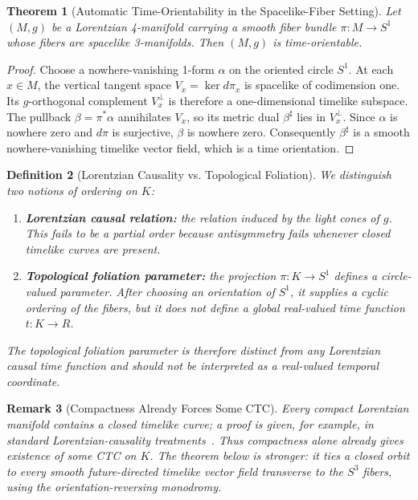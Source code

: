 \documentclass[11pt]{article}
\theoremstyle{canonmath}
\newtheorem{theorem}{Theorem}[section]
\newtheorem{definition}[theorem]{Definition}
\newtheorem{remark}[theorem]{Remark}
\theoremstyle{canonpostulate}
\theoremstyle{canonproposition}
\providecommand{\Klein}{\mathcal{K}}
\providecommand{\R}{\mathbb{R}}
\providecommand{\Sone}{S^1}
\providecommand{\Sthree}{S^3}
\def\mathbb#1{#1}%
\def\mathcal#1{#1}%
\begin{document}
\begin{theorem}[Automatic Time-Orientability in the Spacelike-Fiber Setting] \label{thm:automatic_timeorientation}
Let $(M,g)$ be a Lorentzian 4-manifold carrying a smooth fiber bundle $\pi:M\to\Sone$ whose fibers are spacelike 3-manifolds. Then $(M,g)$ is time-orientable.
\end{theorem}
\begin{proof}
Choose a nowhere-vanishing 1-form $\alpha$ on the oriented circle $\Sone$. At each $x\in M$, the vertical tangent space $V_x=\ker d\pi_x$ is spacelike of codimension one. Its $g$-orthogonal complement $V_x^{\perp}$ is therefore a one-dimensional timelike subspace. The pullback $\beta=\pi^*\alpha$ annihilates $V_x$, so its metric dual $\beta^\sharp$ lies in $V_x^{\perp}$. Since $\alpha$ is nowhere zero and $d\pi$ is surjective, $\beta$ is nowhere zero. Consequently $\beta^\sharp$ is a smooth nowhere-vanishing timelike vector field, which is a time orientation.
\end{proof}

\begin{definition}[Lorentzian Causality vs. Topological Foliation] \label{def:causality}
We distinguish two notions of ordering on $\Klein$:
\begin{enumerate}
    \item \textbf{Lorentzian causal relation:} the relation induced by the light cones of $g$. This fails to be a partial order because antisymmetry fails whenever closed timelike curves are present.
    \item \textbf{Topological foliation parameter:} the projection $\pi:\Klein\to\Sone$ defines a circle-valued parameter. After choosing an orientation of $\Sone$, it supplies a cyclic ordering of the fibers, but it does not define a global real-valued time function $t:\Klein\to\R$.
\end{enumerate}
The topological foliation parameter is therefore distinct from any Lorentzian causal time function and should not be interpreted as a real-valued temporal coordinate.
\end{definition}

\begin{remark}[Compactness Already Forces Some CTC]
Every compact Lorentzian manifold contains a closed timelike curve; a proof is given, for example, in standard Lorentzian-causality treatments~\cite{minguzzi}. Thus compactness alone already gives existence of some CTC on $\Klein$. The theorem below is stronger: it ties a closed orbit to \emph{every} smooth future-directed timelike vector field transverse to the $\Sthree$ fibers, using the orientation-reversing monodromy.
\end{remark}
\end{document}
